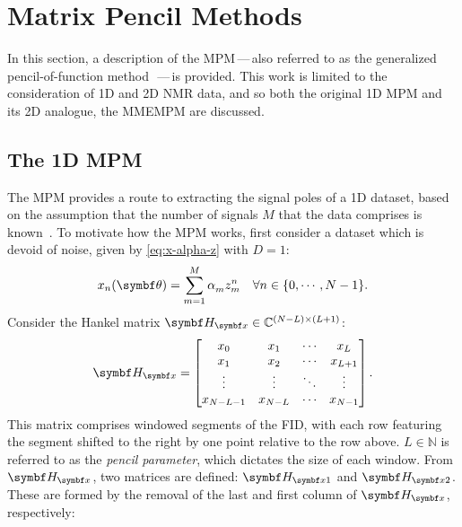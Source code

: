 \section{Matrix Pencil Methods}
\label{sec:mpm}
In this section, a description of the \ac{MPM}\,---\,also referred to as the
generalized pencil-of-function method~\cite{Hua1989}\,---\,is provided. This
work is limited to the consideration of \ac{1D} and \ac{2D} \ac{NMR} data, and
so both the original \ac{1D} \ac{MPM} and its \ac{2D} analogue, the \ac{MMEMPM}
are discussed.

\subsection{The 1D MPM}
\label{subsec:mpm}
The \ac{MPM} provides a route to extracting the signal poles of a \ac{1D}
dataset, based on the assumption that the number of signals $M$ that the data
comprises is known~\cite{Hua1990,Hua1990b,Hua1991}.
To motivate how the \ac{MPM} works, first consider a dataset which is devoid of
noise, given by \cref{eq:x-alpha-z} with $D=1$:
\begin{equation}
    x_n(\bth) = \sumM \alpha_m^{\vphantom{n}} z_m^n
    \quad \forall n \in \lbrace 0, \cdots, N-1 \rbrace.
\end{equation}
Consider the Hankel matrix $\Hx \in \mathbb{C}^{(N-L) \times (L+1)}$:
\begin{equation}
    \Hx =
    \begin{bmatrix}
        x_0 & x_1 & \cdots & x_L\\
        x_1 & x_2 & \cdots & x_{L+1}\\
        \vdots & \vdots & \ddots & \vdots\\
        x_{N-L-1} & x_{N-L} & \cdots & x_{N-1}
    \end{bmatrix}.
\end{equation}
This matrix comprises windowed segments of the FID, with each row featuring
the segment shifted to the right by one point relative to the row above.
$L \in \mathbb{N}$ is referred to as the \emph{pencil parameter}, which
dictates the size of each window. From $\Hx$, two matrices are defined:
$\Hxone$ and $\Hxtwo$.  These are formed by the removal of the last and first
column of $\Hx$, respectively:
